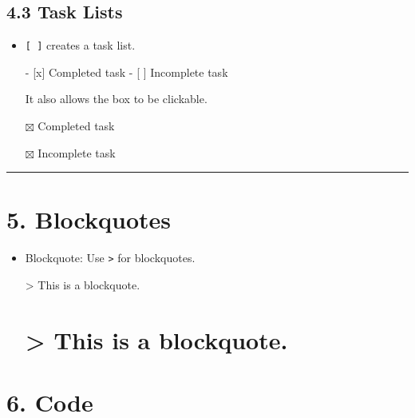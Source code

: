 \documentclass[
]{book}
\newenvironment{Shaded}{\begin{snugshade}}{\end{snugshade}}
\newcommand{\AttributeTok}[1]{\textcolor[rgb]{0.13,0.29,0.53}{#1}}
\newcommand{\NormalTok}[1]{#1}
\newcommand{\SpecialStringTok}[1]{\textcolor[rgb]{0.31,0.60,0.02}{#1}}
\newcommand{\VariableTok}[1]{\textcolor[rgb]{0.00,0.00,0.00}{#1}}
\theoremstyle{definition}
\theoremstyle{definition}
\theoremstyle{definition}
\theoremstyle{definition}
\theoremstyle{remark}
\begin{document}
\subsection{4.3 Task Lists}\label{task-lists}

\begin{itemize}
\item
  \texttt{{[}\ {]}} creates a task list.

\begin{Shaded}
\begin{Highlighting}[]
\SpecialStringTok{{-} }\VariableTok{[x]}\NormalTok{ Completed task}
\SpecialStringTok{{-} }\VariableTok{[ ]}\NormalTok{ Incomplete task}
\end{Highlighting}
\end{Shaded}

  It also allows the box to be clickable.
\item[$\boxtimes$]
  Completed task
\item[$\boxtimes$]
  Incomplete task
\end{itemize}

\begin{center}\rule{0.5\linewidth}{0.5pt}\end{center}

\section{5. Blockquotes}\label{blockquotes}

\begin{itemize}
\item
  Blockquote: Use \texttt{\textgreater{}} for blockquotes.

\begin{Shaded}
\begin{Highlighting}[]
\AttributeTok{\textgreater{} This is a blockquote.}
\end{Highlighting}
\end{Shaded}

  \section{\textgreater{} This is a blockquote.}\label{this-is-a-blockquote.}
\end{itemize}

\section{6. Code}\label{code}
\end{document}
